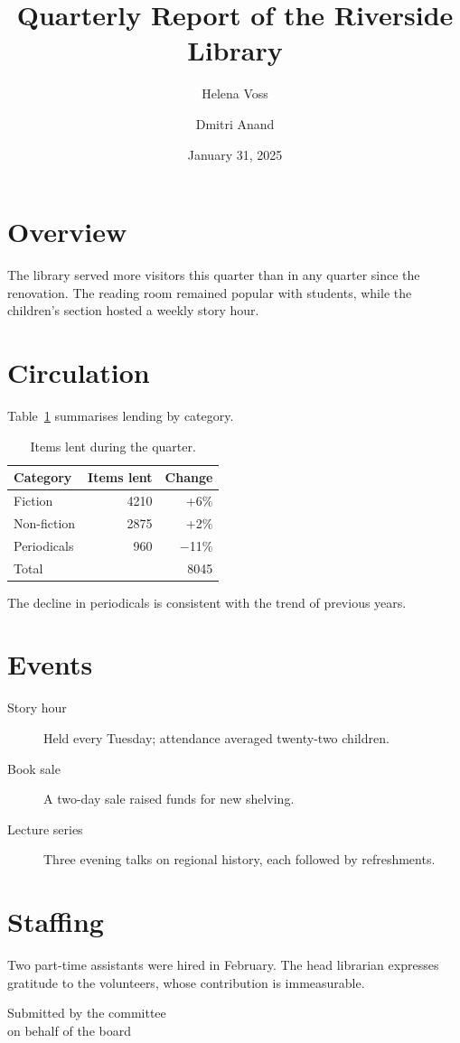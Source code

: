 \documentclass[10pt,letterpaper]{article}
\title{Quarterly Report of the Riverside Library}
\author{Helena Voss \and Dmitri Anand}
\date{January 31, 2025}
\begin{document}
\maketitle
\tableofcontents

\section{Overview}
The library served more visitors this quarter than in any quarter since the
renovation. The reading room remained popular with students, while the
children's section hosted a weekly story hour.

\section{Circulation}
Table~\ref{tab:circ} summarises lending by category.

\begin{table}[htbp]
\centering
\begin{tabular}{|l|r|r|}
\hline
Category & Items lent & Change \\
\hline
Fiction & 4210 & +6\% \\
Non-fiction & 2875 & +2\% \\
Periodicals & 960 & $-$11\% \\
\hline
\multicolumn{2}{|l|}{Total} & 8045 \\
\hline
\end{tabular}
\caption{Items lent during the quarter.}\label{tab:circ}
\end{table}

The decline in periodicals is consistent with the trend of previous years.

\section{Events}
\begin{description}
\item[Story hour] Held every Tuesday; attendance averaged twenty-two children.
\item[Book sale] A two-day sale raised funds for new shelving.
\item[Lecture series] Three evening talks on regional history, each followed
  by refreshments.
\end{description}

\section{Staffing}
\begin{flushleft}
Two part-time assistants were hired in February. The head librarian
expresses gratitude to the volunteers, whose contribution is immeasurable.
\end{flushleft}

\begin{flushright}
Submitted by the committee\\
on behalf of the board
\end{flushright}
\end{document}

